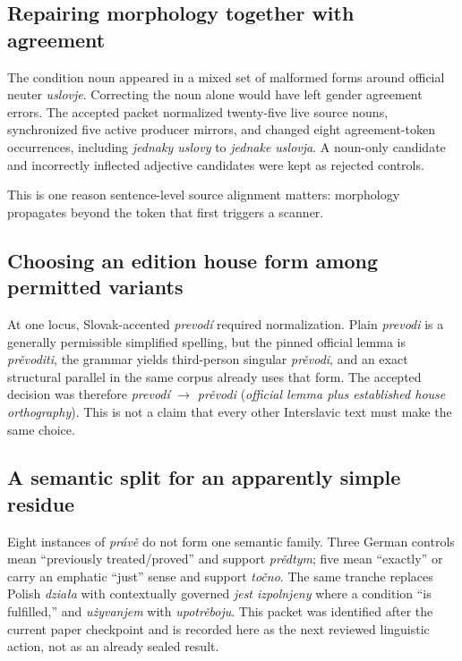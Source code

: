 \documentclass[11pt,a4paper]{article}
\newcommand{\term}[1]{\textit{#1}}
\newcommand{\decision}[3]{\textit{#1} $\rightarrow$ \textit{#2} (\textit{#3})}
\begin{document}
\subsection{Repairing morphology together with agreement}

The condition noun appeared in a mixed set of malformed forms around official neuter \term{uslovje}. Correcting the noun alone would have left gender agreement errors. The accepted packet normalized twenty-five live source nouns, synchronized five active producer mirrors, and changed eight agreement-token occurrences, including \term{jednaky uslovy} to \term{jednake uslovja}. A noun-only candidate and incorrectly inflected adjective candidates were kept as rejected controls.

This is one reason sentence-level source alignment matters: morphology propagates beyond the token that first triggers a scanner.

\subsection{Choosing an edition house form among permitted variants}

At one locus, Slovak-accented \term{prevodí} required normalization. Plain \term{prevodi} is a generally permissible simplified spelling, but the pinned official lemma is \term{prěvoditi}, the grammar yields third-person singular \term{prěvodi}, and an exact structural parallel in the same corpus already uses that form. The accepted decision was therefore \decision{prevodí}{prěvodi}{official lemma plus established house orthography}. This is not a claim that every other Interslavic text must make the same choice.

\subsection{A semantic split for an apparently simple residue}

Eight instances of \term{právě} do not form one semantic family. Three German controls mean ``previously treated/proved'' and support \term{prědtym}; five mean ``exactly'' or carry an emphatic ``just'' sense and support \term{točno}. The same tranche replaces Polish \term{działa} with contextually governed \term{jest izpolnjeny} where a condition ``is fulfilled,'' and \term{użyvanjem} with \term{upotrěboju}. This packet was identified after the current paper checkpoint and is recorded here as the next reviewed linguistic action, not as an already sealed result.
\end{document}
